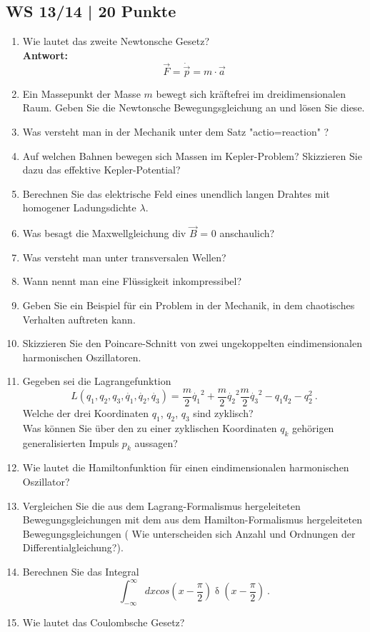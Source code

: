 \subsection{WS 13/14 | 20 Punkte}
\begin{enumerate}
    \item Wie lautet das zweite Newtonsche Gesetz?\\
    \textbf{Antwort:}\\
    \begin{equation*}
        \vec{F} = \dot{\vec{p}} = m \cdot \vec{a}
    \end{equation*}
    \item Ein Massepunkt der Masse $m$ bewegt sich kräftefrei im dreidimensionalen Raum. Geben Sie die Newtonsche Bewegungsgleichung an und lösen Sie diese.
    \item Was versteht man in der Mechanik unter dem Satz  "actio=reaction" ? 
    \item Auf welchen Bahnen bewegen sich Massen im Kepler-Problem? Skizzieren Sie dazu das effektive Kepler-Potential?
    \item Berechnen Sie das elektrische Feld eines unendlich langen Drahtes mit homogener Ladungsdichte $\lambda$.
    \item Was besagt die Maxwellgleichung div $\vec{B}$ = 0 anschaulich?
    \item Was versteht man unter transversalen Wellen?
    \item Wann nennt man eine Flüssigkeit inkompressibel?
    \item Geben Sie ein Beispiel für ein Problem in der Mechanik, in dem chaotisches Verhalten auftreten kann.
    \item Skizzieren Sie den Poincare-Schnitt von zwei ungekoppelten eindimensionalen harmonischen Oszillatoren.
    \item Gegeben sei die Lagrangefunktion
    \begin{equation*}
        L (q_1, q_2, q_3, \dot{q_1}, \dot{q_2}, \dot{q_3}) = \frac{m}{2} \dot{q_1}^2 +  \frac{m}{2} \dot{q_2}^2 \frac{m}{2} \dot{q_3}^2 - q_1 q_2 - q_2^2 \medspace .
    \end{equation*}
            Welche der drei Koordinaten $q_1$, $q_2$, $q_3$ sind zyklisch?\\
            Was können Sie über den zu einer zyklischen Koordinaten $q_k$ gehörigen generalisierten Impuls $p_k$ aussagen?
    \item Wie lautet die Hamiltonfunktion für einen eindimensionalen harmonischen Oszillator?
    \item Vergleichen Sie die aus dem Lagrang-Formalismus hergeleiteten Bewegungsgleichungen mit dem aus dem Hamilton-Formalismus hergeleiteten Bewegungsgleichungen ( Wie unterscheiden sich Anzahl und Ordnungen der Differentialgleichung?).
    \item Berechnen Sie das Integral
    \begin{equation*}
        \int_{-\infty}^{\infty} dx cos(x - \frac{\pi}{2}) \updelta (x - \frac{\pi}{2}) \medspace . 
    \end{equation*}
    \item Wie lautet das Coulombsche Gesetz?
\end{enumerate}

